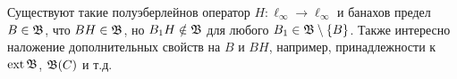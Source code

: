 \begin{hypothesis}
	Существуют такие полуэберлейнов оператор $H:\ell_\infty\to\ell_\infty$ и банахов предел $B\in \mathfrak{B}$,
	что $BH \in \mathfrak{B}$, но $B_1 H \notin \mathfrak{B}$ для любого $B_1\in \mathfrak{B}\setminus\{B\}$.
	Также интересно наложение дополнительных свойств на $B$ и $BH$, например, принадлежности к $\operatorname{ext}\mathfrak{B}$, $\mathfrak{B}(C)$ и т.д.
\end{hypothesis}

